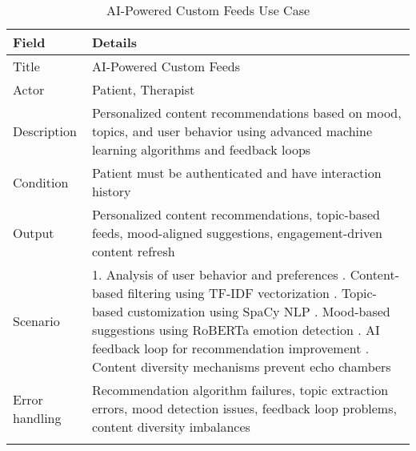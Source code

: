 \begin{longtable}{|p{3cm}|p{12cm}|}
\hline
\textbf{Field} & \textbf{Details} \\
\hline
Title & AI-Powered Custom Feeds \\
\hline
Actor & Patient, Therapist \\
\hline
Description & Personalized content recommendations based on mood, topics, and user behavior using advanced machine learning algorithms and feedback loops \\
\hline
Condition & Patient must be authenticated and have interaction history \\
\hline
Output & Personalized content recommendations, topic-based feeds, mood-aligned suggestions, engagement-driven content refresh \\
\hline
Scenario & 1. Analysis of user behavior and preferences \newline 2. Content-based filtering using TF-IDF vectorization \newline 3. Topic-based customization using SpaCy NLP \newline 4. Mood-based suggestions using RoBERTa emotion detection \newline 5. AI feedback loop for recommendation improvement \newline 6. Content diversity mechanisms prevent echo chambers \\
\hline
Error handling & Recommendation algorithm failures, topic extraction errors, mood detection issues, feedback loop problems, content diversity imbalances \\
\hline
\caption{AI-Powered Custom Feeds Use Case}
\end{longtable}

